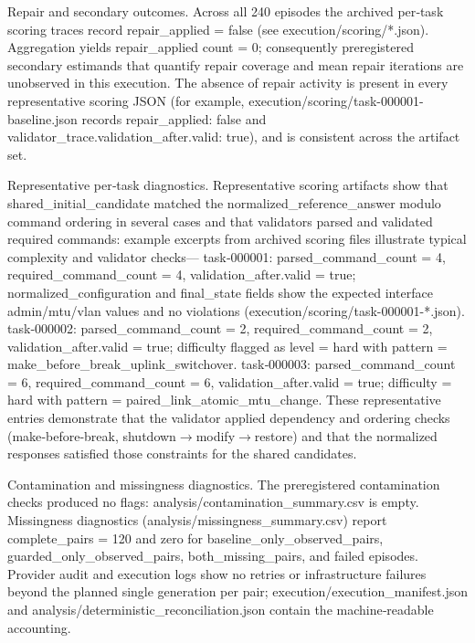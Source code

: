 \documentclass[conference]{IEEEtran}
\begin{document}
Repair and secondary outcomes. Across all 240 episodes the archived per‑task scoring traces record repair\_applied = false (see execution/scoring/*.json). Aggregation yields repair\_applied count = 0; consequently preregistered secondary estimands that quantify repair coverage and mean repair iterations are unobserved in this execution. The absence of repair activity is present in every representative scoring JSON (for example, execution/scoring/task-000001-baseline.json records repair\_applied: false and validator\_trace.validation\_after.valid: true), and is consistent across the artifact set.

Representative per‑task diagnostics. Representative scoring artifacts show that shared\_initial\_candidate matched the normalized\_reference\_answer modulo command ordering in several cases and that validators parsed and validated required commands: example excerpts from archived scoring files illustrate typical complexity and validator checks---
\textbullet{} task‑000001: parsed\_command\_count = 4, required\_command\_count = 4, validation\_after.valid = true; normalized\_configuration and final\_state fields show the expected interface admin/mtu/vlan values and no violations (execution/scoring/task-000001-*.json).
\textbullet{} task‑000002: parsed\_command\_count = 2, required\_command\_count = 2, validation\_after.valid = true; difficulty flagged as level = hard with pattern = make\_before\_break\_uplink\_switchover.
\textbullet{} task‑000003: parsed\_command\_count = 6, required\_command\_count = 6, validation\_after.valid = true; difficulty = hard with pattern = paired\_link\_atomic\_mtu\_change.
These representative entries demonstrate that the validator applied dependency and ordering checks (make‑before‑break, shutdown\ensuremath{\rightarrow}modify\ensuremath{\rightarrow}restore) and that the normalized responses satisfied those constraints for the shared candidates.

Contamination and missingness diagnostics. The preregistered contamination checks produced no flags: analysis/contamination\_summary.csv is empty. Missingness diagnostics (analysis/missingness\_summary.csv) report complete\_pairs = 120 and zero for baseline\_only\_observed\_pairs, guarded\_only\_observed\_pairs, both\_missing\_pairs, and failed episodes. Provider audit and execution logs show no retries or infrastructure failures beyond the planned single generation per pair; execution/execution\_manifest.json and analysis/deterministic\_reconciliation.json contain the machine‑readable accounting.
\end{document}
